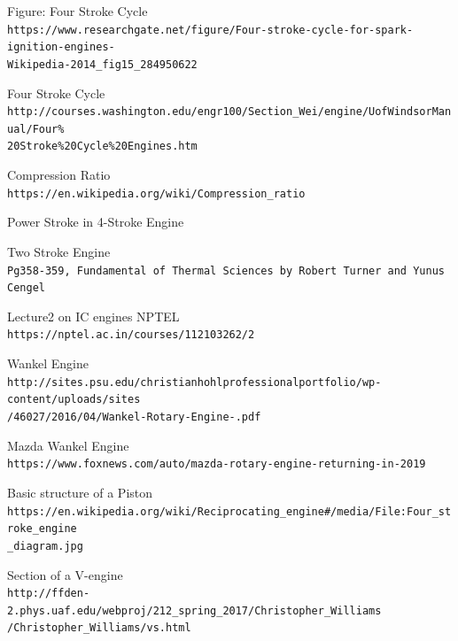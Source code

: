 \documentclass[11pt]{article}
\begin{document}
%
%




\begin{thebibliography}{9}

Figure: Four Stroke Cycle 
\\\texttt{https://www.researchgate.net/figure/Four-stroke-cycle-for-spark-ignition-engines-\\Wikipedia-2014\_fig15\_284950622}

Four Stroke Cycle 
\\\texttt{http://courses.washington.edu/engr100/Section\_Wei/engine/UofWindsorManual/Four\%\\20Stroke\%20Cycle\%20Engines.htm}

Compression Ratio 
\\\texttt{https://en.wikipedia.org/wiki/Compression\_ratio}

Power Stroke in 4-Stroke Engine
\\

Two Stroke Engine 
\\\texttt{Pg358-359, Fundamental of Thermal Sciences by Robert Turner and Yunus Cengel}


Lecture2 on IC engines NPTEL 
\\\texttt{https://nptel.ac.in/courses/112103262/2}


 Wankel Engine
\\\texttt{http://sites.psu.edu/christianhohlprofessionalportfolio/wp-content/uploads/sites\\/46027/2016/04/Wankel-Rotary-Engine-.pdf}

 Mazda Wankel Engine
\\\texttt{https://www.foxnews.com/auto/mazda-rotary-engine-returning-in-2019}


 Basic structure of a Piston
\\\texttt{https://en.wikipedia.org/wiki/Reciprocating\_engine\#/media/File:Four\_stroke\_engine\\\_diagram.jpg}


 Section of a V-engine
\\\texttt{http://ffden-2.phys.uaf.edu/webproj/212\_spring\_2017/Christopher\_Williams\\/Christopher\_Williams/vs.html}


\end{thebibliography}
\end{document}
